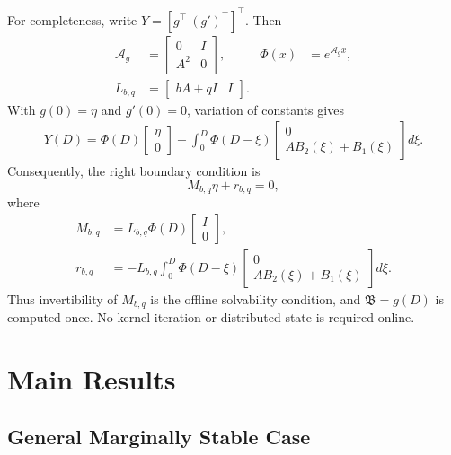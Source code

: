 \documentclass[journal]{IEEEtran}
\newcommand{\Bcal}{\mathfrak B}
\begin{document}
For completeness, write \(Y=[g^\top\ (g')^\top]^\top\). Then
\begin{align}
 \mathcal A_g&=\begin{bmatrix}0&I\\A^2&0\end{bmatrix},
 &\Phi(x)&=e^{\mathcal A_gx}, \nonumber\\
 L_{b,q}&=\begin{bmatrix}bA+qI&I\end{bmatrix}. \label{eq:kernel_first_order}
\end{align}
With \(g(0)=\eta\) and \(g'(0)=0\), variation of constants gives
\begin{align}
 Y(D)=\Phi(D)\begin{bmatrix}\eta\\0\end{bmatrix}
 -\int_0^D\Phi(D-\xi)\begin{bmatrix}0\\AB_2(\xi)+B_1(\xi)\end{bmatrix}d\xi. \label{eq:kernel_variation}
\end{align}
Consequently, the right boundary condition is
\begin{equation}
 M_{b,q}\eta+r_{b,q}=0, \label{eq:kernel_linear_system}
\end{equation}
where
\begin{align}
 M_{b,q}&=L_{b,q}\Phi(D)\begin{bmatrix}I\\0\end{bmatrix}, \label{eq:M_bq}\\
 r_{b,q}&=-L_{b,q}\int_0^D\Phi(D-\xi)\begin{bmatrix}0\\AB_2(\xi)+B_1(\xi)\end{bmatrix}d\xi. \label{eq:r_bq}
\end{align}
Thus invertibility of \(M_{b,q}\) is the offline solvability condition, and \(\Bcal=g(D)\) is computed once. No kernel iteration or distributed state is required online.

\section{Main Results}

\subsection{General Marginally Stable Case}
\end{document}
